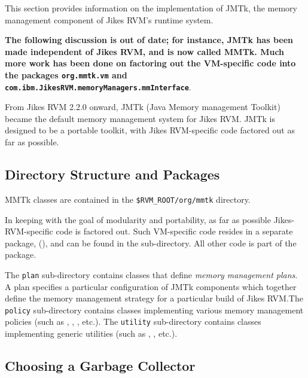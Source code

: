 
This section provides information on the implementation of JMTk, the
memory management component of Jikes\TMweb{} RVM's runtime system.

{\bf The following discussion is out of date; for instance, JMTk has been
made independent of Jikes RVM, and is now called MMTk.  Much more work
has been done on factoring out the VM-specific code into the
packages \texttt{org.mmtk.vm}
and \texttt{com.ibm.JikesRVM.memoryManagers.mmInterface}}. 

From Jikes RVM 2.2.0 onward, JMTk (Java Memory management
Toolkit) became the default memory management system for Jikes RVM.\@
JMTk is designed to be a portable toolkit, with Jikes
RVM-specific code factored out as far as possible.

\subsection{Directory Structure and Packages} \label{sssec:directories}

MMTk classes are contained in the
\texttt{\$RVM\_\-ROOT/org/mmtk} directory.

In keeping with the goal of modularity and portability, as far as
possible Jikes-RVM-specific code is factored out.  Such VM-specific
code resides in a separate package,
(),
and can be found in the \texttt{\mmInterface} sub-directory.  All other
code is part of the
package.

The \texttt{plan} sub-directory contains classes that define
\emph{memory management plans}.  A plan specifies a particular
configuration of JMTk components which together define the memory
management strategy for a particular build of Jikes RVM.\@  The
\texttt{policy} sub-directory contains classes implementing various
memory management policies (such as , , , etc.).  The \texttt{utility}
sub-directory contains classes implementing generic utilities (such as
,
, etc.).

\subsection{Choosing a Garbage Collector} \label{ssec:choosinggc}

